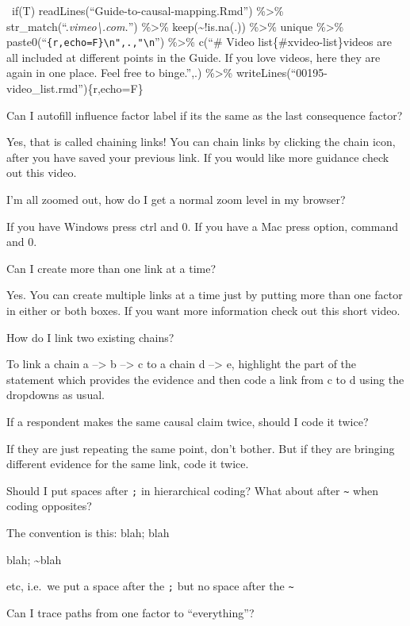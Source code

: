 \documentclass[
]{book}
\begin{document}
~if(T) readLines(``Guide-to-causal-mapping.Rmd'') \%\textgreater\% str\_match(``.\emph{vimeo\textbackslash.com.}'') \%\textgreater\% keep(\textasciitilde!is.na(.)) \%\textgreater\% unique \%\textgreater\% paste0(``\texttt{\{r,echo=F\}\textbackslash{}n",.,"\textbackslash{}n}\n'') \%\textgreater\% c(``\# Video list\{\#xvideo-list\}\n\nThese videos are all included at different points in the Guide. If you love videos, here they are again in one place. Feel free to binge.'',.) \%\textgreater\% writeLines(``00195-video\_list.rmd'')\hspace{0pt}\{r,echo=F\}

Can I autofill influence factor label if its the same as the last consequence factor?

Yes, that is called chaining links! You can chain links by clicking the chain icon, after you have saved your previous link. If you would like more guidance check out this video.

I'm all zoomed out, how do I get a normal zoom level in my browser?

If you have Windows press ctrl and 0. If you have a Mac press option, command and 0.

Can I create more than one link at a time?

Yes. You can create multiple links at a time just by putting more than one factor in either or both boxes. If you want more information check out this short video.

How do I link two existing chains?

To link a chain a --\textgreater{} b --\textgreater{} c to a chain d --\textgreater{} e, highlight the part of the statement which provides the evidence and then code a link from c to d using the dropdowns as usual.

If a respondent makes the same causal claim twice, should I code it twice?

If they are just repeating the same point, don't bother. But if they are bringing different evidence for the same link, code it twice.

Should I put spaces after \texttt{;} in hierarchical coding? What about after \texttt{\textasciitilde{}} when coding opposites?

The convention is this: blah; blah

blah; \textasciitilde blah

etc, i.e.~we put a space after the \texttt{;} but no space after the \texttt{\textasciitilde{}}

Can I trace paths from one factor to ``everything''?
\end{document}
